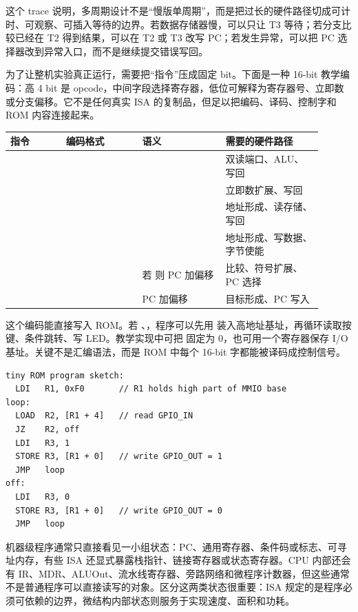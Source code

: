 这个 trace 说明，多周期设计不是“慢版单周期”，而是把过长的硬件路径切成可计时、可观察、可插入等待的边界。若数据存储器慢，可以只让 T3 等待；若分支比较已经在 T2 得到结果，可以在 T2 或 T3 改写 PC；若发生异常，可以把 PC 选择器改到异常入口，而不是继续提交错误写回。

为了让整机实验真正运行，需要把“指令”压成固定 bit。下面是一种 16-bit 教学编码：高 4 bit 是 opcode，中间字段选择寄存器，低位可解释为寄存器号、立即数或分支偏移。它不是任何真实 ISA 的复制品，但足以把编码、译码、控制字和 ROM 内容连接起来。

\begin{longtable}{L{0.16\linewidth}L{0.22\linewidth}L{0.24\linewidth}L{0.28\linewidth}}
\toprule
指令 & 编码格式 & 语义 & 需要的硬件路径 \\
\midrule
{} &  &  & 双读端口、ALU、写回 \\
 &  &  & 立即数扩展、写回 \\
 &  &  & 地址形成、读存储、写回 \\
 &  &  & 地址形成、写数据、字节使能 \\
 &  & 若  则 PC 加偏移 & 比较、符号扩展、PC 选择 \\
 &  & PC 加偏移 & 目标形成、PC 写入 \\
\bottomrule
\end{longtable}

这个编码能直接写入 ROM。若 、，程序可以先用  装入高地址基址，再循环读取按键、条件跳转、写 LED。教学实现中可把  固定为 0，也可用一个寄存器保存 I/O 基址。关键不是汇编语法，而是 ROM 中每个 16-bit 字都能被译码成控制信号。

\begin{lstlisting}
tiny ROM program sketch:
  LDI   R1, 0xF0       // R1 holds high part of MMIO base
loop:
  LOAD  R2, [R1 + 4]   // read GPIO_IN
  JZ    R2, off
  LDI   R3, 1
  STORE R3, [R1 + 0]   // write GPIO_OUT = 1
  JMP   loop
off:
  LDI   R3, 0
  STORE R3, [R1 + 0]   // write GPIO_OUT = 0
  JMP   loop
\end{lstlisting}

机器级程序通常只直接看见一小组状态：PC、通用寄存器、条件码或标志、可寻址内存，有些 ISA 还显式暴露栈指针、链接寄存器或状态寄存器。CPU 内部还会有 IR、MDR、ALUOut、流水线寄存器、旁路网络和微程序计数器，但这些通常不是普通程序可以直接读写的对象。区分这两类状态很重要：ISA 规定的是程序必须可依赖的边界，微结构内部状态则服务于实现速度、面积和功耗。

